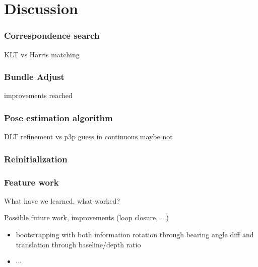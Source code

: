 \section{Discussion}

\subsubsection{Correspondence search}
KLT vs Harris matching

\subsubsection{Bundle Adjust}
improvements reached

\subsubsection{Pose estimation algorithm}
DLT refinement vs p3p guess in continuous  maybe not

\subsubsection{Reinitialization}

\subsubsection{Feature work}
What have we learned, what worked?

Possible future work, improvements (loop closure, ...)
\begin{itemize}
\item bootstrapping with both information rotation through bearing angle diff and translation through baseline/depth ratio
\item $\cdots$
\end{itemize}

